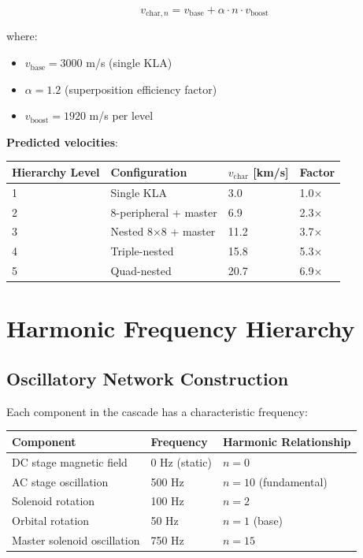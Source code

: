 \documentclass[12pt,a4paper]{article}
\begin{document}
\begin{equation}
v_{\text{char},n} = v_{\text{base}} + \alpha \cdot n \cdot v_{\text{boost}}
\end{equation}

where:
\begin{itemize}
\item $v_{\text{base}} = 3000$ m/s (single KLA)
\item $\alpha = 1.2$ (superposition efficiency factor)
\item $v_{\text{boost}} = 1920$ m/s per level
\end{itemize}

\textbf{Predicted velocities}:
\begin{center}
\begin{tabular}{|l|l|l|l|}
\hline
\textbf{Hierarchy Level} & \textbf{Configuration} & \textbf{$v_{\text{char}}$ [km/s]} & \textbf{Factor} \\
\hline
1 & Single KLA & 3.0 & 1.0× \\
2 & 8-peripheral + master & 6.9 & 2.3× \\
3 & Nested 8×8 + master & 11.2 & 3.7× \\
4 & Triple-nested & 15.8 & 5.3× \\
5 & Quad-nested & 20.7 & 6.9× \\
\hline
\end{tabular}
\end{center}

\section{Harmonic Frequency Hierarchy}

\subsection{Oscillatory Network Construction}

Each component in the cascade has a characteristic frequency:

\begin{center}
\begin{tabular}{|l|l|l|}
\hline
\textbf{Component} & \textbf{Frequency} & \textbf{Harmonic Relationship} \\
\hline
DC stage magnetic field & 0 Hz (static) & $n = 0$ \\
AC stage oscillation & 500 Hz & $n = 10$ (fundamental) \\
Solenoid rotation & 100 Hz & $n = 2$ \\
Orbital rotation & 50 Hz & $n = 1$ (base) \\
Master solenoid oscillation & 750 Hz & $n = 15$ \\
\hline
\end{tabular}
\end{center}
\end{document}
